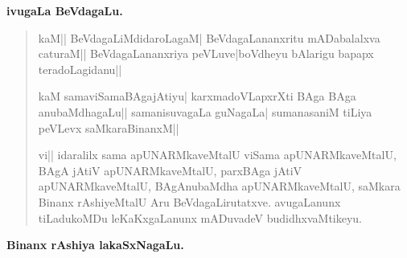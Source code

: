 \eject

\begin{center}
{\large\bf ivugaLa BeVdagaLu.}
\end{center}

\begin{verse}
kaM|| BeVdagaLiMdidaroLagaM| BeVdagaLananxritu mADabalalxva caturaM|| BeVdagaLananxriya peVLuve|\break boVdheyu bAlarigu bapapx teradoLagidanu||

kaM samaviSamaBAgajAtiyu| karxmadoVLapxrXti BAga BAga anubaMdhagaLu|| samanisuvagaLa guNagaLa| sumanasaniM tiLiya peVLevx saMkaraBinanxM||

vi|| idaralilx sama apUNARMkaveMtalU viSama apUNARMkaveMtalU, BAgA jAtiV apUNA\-RMkaveMtalU, parxBAga jAtiV apU\-NARMkaveMtalU, BAgAnubaMdha apUNARMkaveMtalU, saMkara Binanx rAshiyeMtalU Aru BeVdagaLirutatxve. avugaLanunx tiLadukoMDu leKaKxgaLanunx mADuvadeV budidhxvaMtikeyu.
\end{verse}

\begin{center}
{\large\bf Binanx rAshiya lakaSxNagaLu.}
\end{center}


